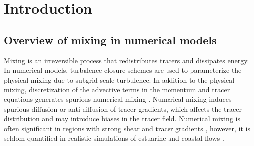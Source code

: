 \documentclass[draft]{agujournal2019}
\begin{document}
%
%

%


%
%
%
%

\section{Introduction}

\subsection{Overview of mixing in numerical models}

Mixing is an irreversible process that redistributes tracers and dissipates energy. In numerical models, turbulence closure schemes are used to parameterize the physical mixing due to subgrid-scale turbulence. In addition to the physical mixing, discretization of the advective terms in the momentum and tracer equations generates spurious numerical mixing \cite{Burchard_2008, Griffies_2000, Smolarkiewicz_1983}. Numerical mixing induces spurious diffusion or anti-diffusion of tracer gradients, which affects the tracer distribution and may introduce biases in the tracer field. Numerical mixing is often significant in regions with strong shear and tracer gradients \cite{Rennau_2009, Fringer_2019, Kalra_2019}, however, it is seldom quantified in realistic simulations of estuarine and coastal flows \cite{Broatch_2022, Ralston_2017, Wang_2021}. 
\end{document}
